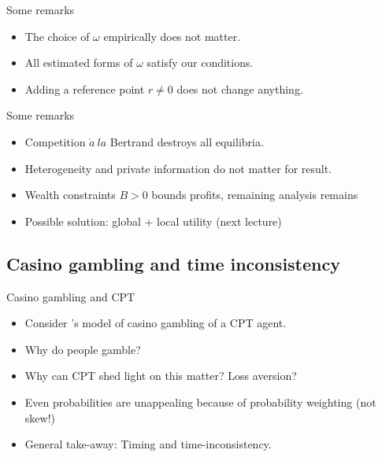        \begin{frame}{Some remarks}
           \begin{itemize}
               \item The choice of $\omega$ empirically does not matter.\bigskip
               \item All estimated forms of $\omega$ satisfy our conditions.\bigskip
               \item Adding a reference point $r\neq 0$ does not change anything.\bigskip
           \end{itemize}
       \end{frame}

       \begin{frame}{Some remarks}
        \begin{itemize}
            \item Competition $\grave{a}~la$ Bertrand destroys all equilibria.\bigskip
            \item Heterogeneity and private information do not matter for result.\bigskip
            \item Wealth constraints $B>0$ bounds profits, remaining analysis remains\bigskip
            \item Possible solution: global + local utility (next lecture)\bigskip
        \end{itemize}
    \end{frame}


\subsection{Casino gambling and time inconsistency}

\begin{frame}{Casino gambling and CPT}
    \begin{itemize}
        \item Consider \citet{Barberis2012a}'s model of casino gambling of a CPT agent.\bigskip
        \item Why do people gamble?\bigskip
        \item Why can CPT shed light on this matter? Loss aversion?\bigskip
        \item Even probabilities are unappealing because of probability weighting (not skew!)\bigskip
        \item General take-away: Timing and time-inconsistency.\bigskip
    \end{itemize}
\end{frame}

